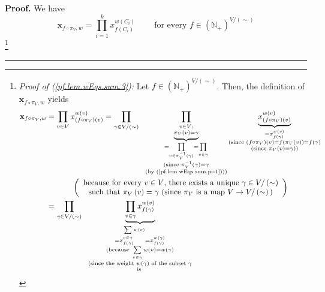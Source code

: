 \documentclass[numbers=enddot,12pt,final,onecolumn,notitlepage]{scrartcl}%
\theoremstyle{definition}
\newenvironment{proof}[1][Proof]{\noindent\textbf{#1.} }{\ \rule{0.5em}{0.5em}}
\newenvironment{verlong}{}{}
\let\sumnonlimits\sum
\let\prodnonlimits\prod
\renewcommand{\sum}{\sumnonlimits\limits}
\renewcommand{\prod}{\prodnonlimits\limits}
\begin{document}
\begin{verlong}
\begin{proof}
We have%
\begin{equation}
\mathbf{x}_{f\circ\pi_{V},w}=\prod_{i=1}^{k}x_{f\left(  C_{i}\right)
}^{w\left(  C_{i}\right)  }\ \ \ \ \ \ \ \ \ \ \text{for every }f\in\left(
\mathbb{N}_{+}\right)  ^{V/\left(  \sim\right)  } \label{pf.lem.wEqs.sum.3}%
\end{equation}
\footnote{\textit{Proof of (\ref{pf.lem.wEqs.sum.3}):} Let $f\in\left(
\mathbb{N}_{+}\right)  ^{V/\left(  \sim\right)  }$. Then, the definition of
$\mathbf{x}_{f\circ\pi_{V},w}$ yields%
\begin{align*}
\mathbf{x}_{f\circ\pi_{V},w}  &  =\prod_{v\in V}x_{\left(  f\circ\pi
_{V}\right)  \left(  v\right)  }^{w\left(  v\right)  }=\prod_{\gamma\in
V/\left(  \sim\right)  }\ \ \underbrace{\prod_{\substack{v\in V;\\\pi
_{V}\left(  v\right)  =\gamma}}}_{\substack{=\prod_{v\in\pi_{V}^{-1}\left(
\gamma\right)  }=\prod_{v\in\gamma}\\\text{(since }\pi_{V}^{-1}\left(
\gamma\right)  =\gamma\\\text{(by (\ref{pf.lem.wEqs.sum.pi-1})))}%
}}\underbrace{x_{\left(  f\circ\pi_{V}\right)  \left(  v\right)  }^{w\left(
v\right)  }}_{\substack{=x_{f\left(  \gamma\right)  }^{w\left(  v\right)
}\\\text{(since }\left(  f\circ\pi_{V}\right)  \left(  v\right)  =f\left(
\pi_{V}\left(  v\right)  \right)  =f\left(  \gamma\right)  \\\text{(since }%
\pi_{V}\left(  v\right)  =\gamma\text{))}}}\\
&  \ \ \ \ \ \ \ \ \ \ \left(
\begin{array}
[c]{c}%
\text{because for every }v\in V\text{, there exists a unique }\gamma\in
V/\left(  \sim\right) \\
\text{such that }\pi_{V}\left(  v\right)  =\gamma\text{ (since }\pi_{V}\text{
is a map }V\rightarrow V/\left(  \sim\right)  \text{)}%
\end{array}
\right) \\
&  =\prod_{\gamma\in V/\left(  \sim\right)  }\ \ \underbrace{\prod_{v\in
\gamma}x_{f\left(  \gamma\right)  }^{w\left(  v\right)  }}%
_{\substack{=x_{f\left(  \gamma\right)  }^{\sum_{v\in\gamma}w\left(  v\right)
}=x_{f\left(  \gamma\right)  }^{w\left(  \gamma\right)  }\\\text{(because
}\sum_{v\in\gamma}w\left(  v\right)  =w\left(  \gamma\right)  \\\text{(since
the weight }w\left(  \gamma\right)  \text{ of the subset }\gamma\\\text{is
}}}
\end{align*}}
\end{proof}
\end{verlong}
\end{document}
